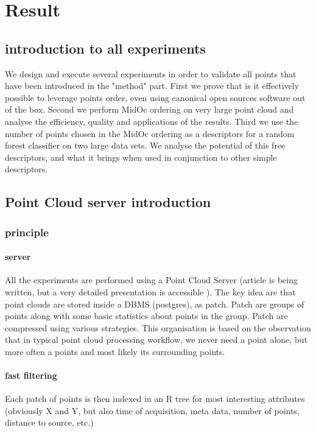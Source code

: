 

 \section{\label{sec:result}Result}
 	\subsection{introduction to all experiments}
 		We design and execute several experiments in order to validate all points that have been introduced in the "method" part.
 		First we prove that is it effectively possible to leverage points order, even using canonical open sources software out of the box.
 		Second we perform MidOc ordering on very large point cloud and analyse the efficiency, quality and applications of the results.
 		Third we use the number of points chosen in the MidOc ordering as a descriptors for a random forest classifier on two large data sets.
 		We analyse the potential of this free descriptors, and what it brings when used in conjunction to other simple descriptors.
	\subsection{Point Cloud server introduction}
		\subsubsection{principle}
			\paragraph{server}
				All the experiments are performed using a Point Cloud Server (article is being written, but a very detailed presentation is accessible ).
				The key idea are that point clouds are stored inside a DBMS (postgres), as patch. Patch are groups of points along with some basic statistics about points in the group. Patch are compressed using various strategies.
				This organisation is based on the observation that in typical point cloud processing workflow, we never need a point alone, but more often a points and most likely its surrounding points.
			
			\paragraph{fast filtering}
				Each patch of points is then indexed in an R tree for most interesting attributes (obviously X and Y, but also time of acquisition, meta data, number of points, distance to source, etc.)
				
